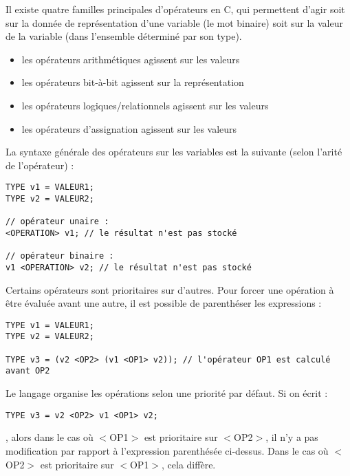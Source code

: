 \documentclass[../../../main.tex]{subfiles}
\begin{document}

Il existe quatre familles principales d'opérateurs en C, qui permettent d'agir soit sur la donnée de représentation d'une variable (le mot binaire) soit sur la valeur de la variable (dans l'ensemble déterminé par son type).
\begin{itemize}
	\item les opérateurs arithmétiques agissent sur les valeurs
	\item les opérateurs bit-à-bit agissent sur la représentation
	\item les opérateurs logiques/relationnels agissent sur les valeurs
	\item les opérateurs d'assignation agissent sur les valeurs
\end{itemize}
La syntaxe générale des opérateurs sur les variables est la suivante (selon l'arité de l'opérateur) :
\begin{verbatim}
TYPE v1 = VALEUR1;
TYPE v2 = VALEUR2;

// opérateur unaire :
<OPERATION> v1; // le résultat n'est pas stocké

// opérateur binaire :
v1 <OPERATION> v2; // le résultat n'est pas stocké
\end{verbatim}
Certains opérateurs sont prioritaires sur d'autres. Pour forcer une opération à être évaluée avant une autre, il est possible de parenthéser les expressions :
\begin{verbatim}
TYPE v1 = VALEUR1;
TYPE v2 = VALEUR2;

TYPE v3 = (v2 <OP2> (v1 <OP1> v2)); // l'opérateur OP1 est calculé avant OP2
\end{verbatim}
Le langage organise les opérations selon une priorité par défaut. Si on écrit :
\begin{verbatim}
TYPE v3 = v2 <OP2> v1 <OP1> v2;
\end{verbatim}
, alors dans le cas où \textsf{$<$OP1$>$} est prioritaire sur \textsf{$<$OP2$>$}, il n'y a pas modification par rapport à l'expression parenthésée ci-dessus. Dans le cas où \textsf{$<$OP2$>$} est prioritaire sur \textsf{$<$OP1$>$}, cela diffère.
 
\end{document}
